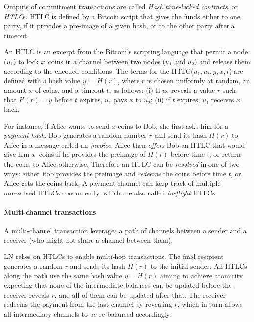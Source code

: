 Outputs of commitment transactions are called \textit{Hash time-locked contracts}, or \textit{HTLC}s.
HTLC is defined by a Bitcoin script that gives the funds either to one party, if it provides a pre-image of a given hash, or to the other party after a timeout.

An HTLC is an excerpt from the Bitcoin's scripting language that 
permit a node ($u_1$) to lock $x$~coins in a channel between two nodes ($u_1$ and $u_2$) 
and release them according to the encoded conditions.
The terms for the HTLC($u_1, u_2, y, x, t$) are defined with a hash value $y := H(r)$, 
where $r$ is chosen uniformly at random, 
an amount $x$ of coins, and a timeout $t$, as follows: 
(i) If $u_2$ reveals a value $r$ such that $H(r) = y$ before $t$ expires, $u_1$ pays $x$ to $u_2$; 
(ii) if $t$ expires, $u_1$ receives $x$ back.

For instance, if Alice wants to send $x$ coins to Bob, she first asks him for a \textit{payment hash}.
Bob generates a random number $r$ and send its hash $H(r)$ to Alice in a message called an \textit{invoice}.
Alice then \textit{offers} Bob an HTLC that would give him $x$~coins if he provides the preimage of $H(r)$ before time $t$, or return the coins to Alice otherwise.
Therefore an HTLC can be \textit{resolved} in one of two ways: either Bob provides the preimage and \textit{redeems} the coins before time $t$, or Alice gets the coins back.
A payment channel can keep track of multiple unresolved HTLCs concurrently, which are also called \textit{in-flight} HTLCs.


\paragraph{Multi-channel transactions}

A multi-channel transaction leverages a path of channels between a sender and a receiver (who might not share a channel between them).

LN relies on HTLCs to enable multi-hop transactions. 
The final recipient generates a random $r$ and sends its hash $H(r)$ to the initial sender.
All HTLCs along the path use the same hash value $y=H(r)$ aiming to achieve atomicity expecting that none of the intermediate balances can be updated before the receiver reveals $r$, and all of them can be updated after that.
The receiver redeems the payment from the last channel by revealing $r$, which in turn allows all intermediary channels to be re-balanced accordingly.


